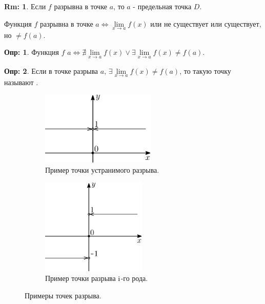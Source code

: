 \documentclass[12pt]{article}
\newcommand{\RN}[1]{%
	\textup{\uppercase\expandafter{\romannumeral#1}}%
}
\theoremstyle{definition}
\newtheorem{defn}{Опр:}
\newtheorem{rem}{Rm:}
\begin{document}
\begin{rem}
	Если $f$ разрывна в точке $a$, то $a$ - предельная точка $D$. 
\end{rem}

Функция $f$ разрывна в точке $a \Leftrightarrow \lim\limits_{x \to a} f(x)$ или не существует или существует, но $\neq f(a)$.

\begin{defn}
	Функция $f$  $a \Leftrightarrow \nexists \lim\limits_{x \to a} f(x) \vee \exists \lim\limits_{x \to a} f(x) \neq f(a)$.
\end{defn}

\begin{defn}
	Если в точке разрыва $a, \, \exists \lim\limits_{x \to a} f(x) \neq f(a)$, то такую точку называют .
\end{defn}

\begin{figure}[H]
	\begin{subfigure}[b]{0.5\textwidth}
		\centering
		\includegraphics[width=0.6\textwidth]{17_2.eps}
		\caption{Пример точки устранимого разрыва.}
		\label{17_2}
	\end{subfigure}%
	\begin{subfigure}[b]{0.5\textwidth}
		\centering
		\includegraphics[width=0.55\textwidth]{17_3.eps}
		\caption{Пример точки разрыва $\RN{1}$-го рода.}
		\label{17_3}
	\end{subfigure}
\caption{Примеры точек разрыва.}
\end{figure}
\end{document}
